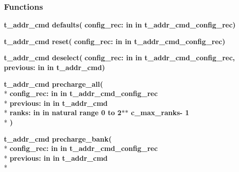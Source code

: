 \subsubsection*{Functions}
 \begin{DoxyCompactItemize}
\item 
{\bfseries {\bfseries \textcolor{vhdlchar}{t\+\_\+addr\+\_\+cmd}\textcolor{vhdlchar}{ }}} {\bf defaults}{\bfseries  ( }{\bfseries \textcolor{vhdlchar}{config\+\_\+rec\+: }\textcolor{stringliteral}{in }\textcolor{vhdlchar}{in t\+\_\+addr\+\_\+cmd\+\_\+config\+\_\+rec}}{\bfseries  )} 
\item 
{\bfseries {\bfseries \textcolor{vhdlchar}{t\+\_\+addr\+\_\+cmd}\textcolor{vhdlchar}{ }}} {\bf reset}{\bfseries  ( }{\bfseries \textcolor{vhdlchar}{config\+\_\+rec\+: }\textcolor{stringliteral}{in }\textcolor{vhdlchar}{in t\+\_\+addr\+\_\+cmd\+\_\+config\+\_\+rec}}{\bfseries  )} 
\item 
{\bfseries {\bfseries \textcolor{vhdlchar}{t\+\_\+addr\+\_\+cmd}\textcolor{vhdlchar}{ }}} {\bf deselect}{\bfseries  ( }{\bfseries \textcolor{vhdlchar}{config\+\_\+rec\+: }\textcolor{stringliteral}{in }\textcolor{vhdlchar}{in t\+\_\+addr\+\_\+cmd\+\_\+config\+\_\+rec}}{\bfseries  , \textcolor{vhdlchar}{previous\+: }\textcolor{stringliteral}{in }\textcolor{vhdlchar}{in t\+\_\+addr\+\_\+cmd}}{\bfseries  )} 
\item 
{\bfseries {\bfseries \textcolor{vhdlchar}{t\+\_\+addr\+\_\+cmd}\textcolor{vhdlchar}{ }}} {\bf precharge\+\_\+all}{\bfseries  ( }\\*
{\bfseries \textcolor{vhdlchar}{config\+\_\+rec\+: }\textcolor{stringliteral}{in }\textcolor{vhdlchar}{in t\+\_\+addr\+\_\+cmd\+\_\+config\+\_\+rec}}\\*
{\bfseries \textcolor{vhdlchar}{previous\+: }\textcolor{stringliteral}{in }\textcolor{vhdlchar}{in t\+\_\+addr\+\_\+cmd}}\\*
{\bfseries \textcolor{vhdlchar}{ranks\+: }\textcolor{stringliteral}{in }\textcolor{vhdlchar}{in natural   range  0 to  2$\ast$$\ast$   c\+\_\+max\+\_\+ranks-\/ 1}}\\*
{\bfseries  )} 
\item 
{\bfseries {\bfseries \textcolor{vhdlchar}{t\+\_\+addr\+\_\+cmd}\textcolor{vhdlchar}{ }}} {\bf precharge\+\_\+bank}{\bfseries  ( }\\*
{\bfseries \textcolor{vhdlchar}{config\+\_\+rec\+: }\textcolor{stringliteral}{in }\textcolor{vhdlchar}{in t\+\_\+addr\+\_\+cmd\+\_\+config\+\_\+rec}}\\*
{\bfseries \textcolor{vhdlchar}{previous\+: }\textcolor{stringliteral}{in }\textcolor{vhdlchar}{in t\+\_\+addr\+\_\+cmd}}\\*

\end{DoxyCompactItemize}
